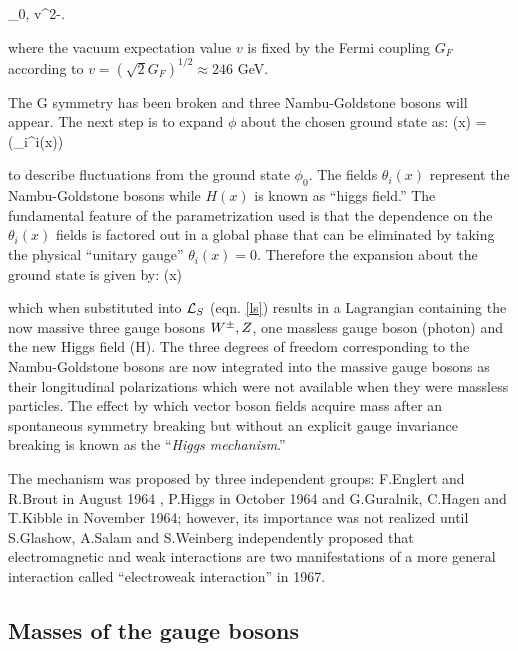 \beqn\label{field_exp}
\phi_0\equiv{}, \qquad v^2\equiv-.
\eeqn

\noindent where the vacuum expectation value $v$ is fixed by the Fermi coupling $G_F$ according to $v=(\sqrt{2}G_F)^{1/2}\approx 246$ GeV.

\noindent The G symmetry has been broken and three Nambu-Goldstone bosons will appear. The next step is to expand $\phi$ about the chosen ground state as:
\beqn
\phi(x) = \exp\left(\sigma_i\theta^i(x)\right) \approx {} 
\eeqn

\noindent to describe fluctuations from the ground state $\phi_0$. The fields $\theta_i(x)$ represent the Nambu-Goldstone bosons while $H(x)$ is known as ``higgs field.'' The fundamental feature of the parametrization used is that the dependence on the $\theta_i(x)$ fields is factored out in a global phase that can be eliminated by taking the physical ``unitary gauge'' $\theta_i(x)=0$. Therefore the expansion about the ground state is given by:
\beqn\label{higgs_dublet}
\phi(x)
\eeqn

\noindent which when substituted into $\mathcal{L}_S$ (eqn. \ref{ls}) results in a Lagrangian containing the now massive three gauge bosons $W^\pm, Z$, one massless gauge boson (photon) and the new Higgs field (H). The three degrees of freedom corresponding to the Nambu-Goldstone bosons are now integrated into the massive gauge bosons as their longitudinal polarizations which were not available when they were massless particles. The effect by which vector boson fields acquire mass after an spontaneous symmetry breaking but without an explicit gauge invariance breaking is known as the ``\textit{Higgs mechanism}.''

\noindent The mechanism was proposed by three independent groups: F.Englert and R.Brout in August 1964 \cite{englert}, P.Higgs in October 1964 \cite{higgs} and G.Guralnik, C.Hagen and T.Kibble in November 1964\cite{ghk}; however, its importance was not realized until S.Glashow\cite{glashow}, A.Salam\cite{salam} and S.Weinberg \cite{weinberg} independently proposed that electromagnetic and weak interactions are two manifestations of a more general interaction called ``electroweak interaction'' in 1967.

\subsection{Masses of the gauge bosons}

